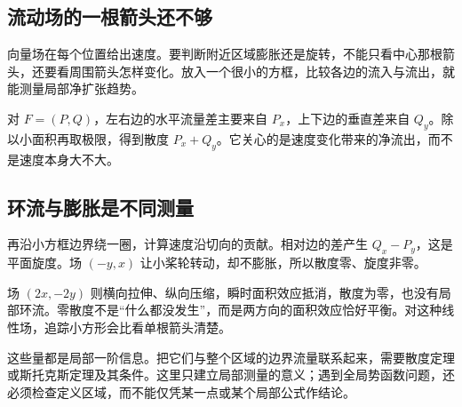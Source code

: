 \subsection*{流动场的一根箭头还不够}
向量场在每个位置给出速度。要判断附近区域膨胀还是旋转，不能只看中心那根箭头，还要看周围箭头怎样变化。放入一个很小的方框，比较各边的流入与流出，就能测量局部净扩张趋势。

对 $F=(P,Q)$，左右边的水平流量差主要来自 $P_x$，上下边的垂直差来自 $Q_y$。除以小面积再取极限，得到散度 $P_x+Q_y$。它关心的是速度变化带来的净流出，而不是速度本身大不大。

\subsection*{环流与膨胀是不同测量}
再沿小方框边界绕一圈，计算速度沿切向的贡献。相对边的差产生 $Q_x-P_y$，这是平面旋度。场 $(-y,x)$ 让小桨轮转动，却不膨胀，所以散度零、旋度非零。

场 $(2x,-2y)$ 则横向拉伸、纵向压缩，瞬时面积效应抵消，散度为零，也没有局部环流。零散度不是“什么都没发生”，而是两方向的面积效应恰好平衡。对这种线性场，追踪小方形会比看单根箭头清楚。

这些量都是局部一阶信息。把它们与整个区域的边界流量联系起来，需要散度定理或斯托克斯定理及其条件。这里只建立局部测量的意义；遇到全局势函数问题，还必须检查定义区域，而不能仅凭某一点或某个局部公式作结论。
